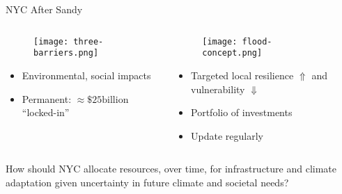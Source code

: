 \documentclass[
  10pt,     %
]{beamer}
\begin{document}
\begin{frame}{NYC After Sandy \citep{CityofNewYork:2013uh}}
  \begin{columns}[T]
    \pause
    \begin{column}{0.5\textwidth}
      \begin{figure}
        \texttt{[image: three-barriers.png]}
      \end{figure}
      \begin{itemize}
        \item Environmental, social impacts
        \item Permanent: $\approx \$25 \text{billion}$ ``locked-in''
      \end{itemize}
    \end{column}
    \pause
    \begin{column}{0.5\textwidth}
      \begin{figure}
        \texttt{[image: flood-concept.png]}
      \end{figure}
      \begin{itemize}
        \item Targeted local resilience $\Uparrow$ and vulnerability $\Downarrow$
        \item Portfolio of investments
        \item Update regularly
      \end{itemize}
    \end{column}
  \end{columns}
  \pause
  \begin{alertblock}{How should NYC allocate resources, over time,}
    for infrastructure and climate adaptation given uncertainty in future climate and societal needs?
  \end{alertblock}
\end{frame}
\end{document}
